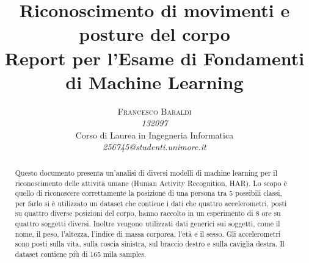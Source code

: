\documentclass[10pt,a4paper]{article}
\begin{document}
\title{Riconoscimento di movimenti e posture del corpo \\
\Large{Report per l'Esame di Fondamenti di Machine Learning}
} %

\author{\textsc{Francesco Baraldi} \\
    \emph{132097} \\
    Corso di Laurea in Ingegneria Informatica\\
    \emph{256745@studenti.unimore.it}
  }

\date{}

\maketitle %

\begin{abstract}
\normalsize
Questo documento presenta un'analisi di diversi modelli di machine learning per il riconoscimento delle attività umane (Human Activity Recognition, HAR). Lo scopo è quello di riconoscere correttamente la posizione di una persona tra 5 possibili classi, per farlo si è utilizzato un dataset che contiene i dati che quattro accelerometri, posti su quattro diverse posizioni del corpo, hanno raccolto in un esperimento di 8 ore su quattro soggetti diversi. Inoltre vengono utilizzati dati generici sui soggetti, come il nome, il peso, l'altezza, l'indice di massa corporea, l'età e il sesso. Gli accelerometri sono posti sulla vita, sulla coscia sinistra, sul braccio destro e sulla caviglia destra. Il dataset contiene più di 165 mila samples.

\end{abstract}







%
\appendix
\printbibliography[heading=bibintoc]
\end{document}
